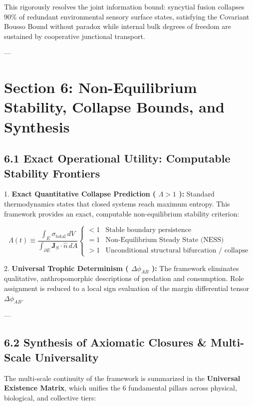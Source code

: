 \documentclass[11pt,a4paper]{article}
\theoremstyle{definition}
\theoremstyle{remark}
\begin{document}
This rigorously resolves the joint information bound: syncytial fusion collapses $90\%$ of redundant environmental sensory surface states, satisfying the Covariant Bousso Bound without paradox while internal bulk degrees of freedom are sustained by cooperative junctional transport.

---

\section{Section 6: Non-Equilibrium Stability, Collapse Bounds, and Synthesis}

\subsection{6.1 Exact Operational Utility: Computable Stability Frontiers}
1. \textbf{Exact Quantitative Collapse Prediction ( $\Lambda > 1$ ):}
Standard thermodynamics states that closed systems reach maximum entropy. This framework provides an exact, computable non-equilibrium stability criterion:


\begin{equation}
\Lambda(t) \equiv \frac{\int_E \sigma_{\text{total}} \, dV}{\int_{\partial E} \mathbf{J}_S \cdot \hat{n} \, dA} \begin{cases} < 1 & \text{Stable boundary persistence} \\ = 1 & \text{Non-Equilibrium Steady State (NESS)} \\ > 1 & \text{Unconditional structural bifurcation / collapse} \end{cases}
\end{equation}


2. \textbf{Universal Trophic Determinism ( $\Delta \phi_{AB}$ ):}
The framework eliminates qualitative, anthropomorphic descriptions of predation and consumption. Role assignment is reduced to a local sign evaluation of the margin differential tensor $\Delta \phi_{AB}$.

---

\subsection{6.2 Synthesis of Axiomatic Closures \& Multi-Scale Universality}

The multi-scale continuity of the framework is summarized in the \textbf{Universal Existence Matrix}, which unifies the 6 fundamental pillars across physical, biological, and collective tiers:
\end{document}
